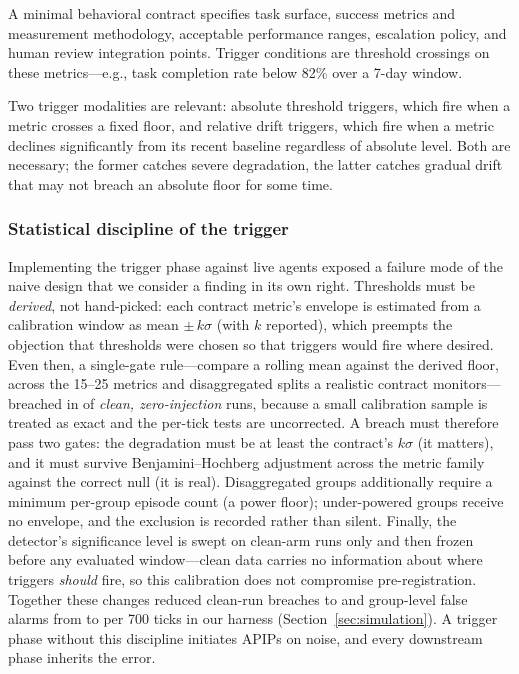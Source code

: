 A minimal behavioral contract specifies task surface, success metrics and
measurement methodology, acceptable performance ranges, escalation policy, and
human review integration points. Trigger conditions are threshold crossings on
these metrics---e.g., task completion rate below 82\% over a 7-day window.

Two trigger modalities are relevant: absolute threshold triggers, which fire
when a metric crosses a fixed floor, and relative drift triggers, which fire
when a metric declines significantly from its recent baseline regardless of
absolute level. Both are necessary; the former catches severe degradation, the
latter catches gradual drift that may not breach an absolute floor for some
time.

\subsubsection{Statistical discipline of the trigger}
\label{subsubsec:trigger-stats}

Implementing the trigger phase against live agents exposed a failure mode of
the naive design that we consider a finding in its own right. Thresholds must
be \emph{derived}, not hand-picked: each contract metric's envelope is
estimated from a calibration window as mean $\pm\, k\sigma$ (with $k$
reported), which preempts the objection that thresholds were chosen so that
triggers would fire where desired. Even then, a single-gate rule---compare a
rolling mean against the derived floor, across the 15--25 metrics and
disaggregated splits a realistic contract monitors---breached in
\cleanFalseBreachBefore{} of \emph{clean, zero-injection} runs, because a
small calibration sample is treated as exact and the per-tick tests are
uncorrected. A breach must therefore pass two gates: the degradation must be
at least the contract's $k\sigma$ (it matters), and it must survive
Benjamini--Hochberg adjustment across the metric family against the correct
null (it is real). Disaggregated groups additionally require a minimum
per-group episode count (a power floor); under-powered groups receive no
envelope, and the exclusion is recorded rather than silent. Finally, the
detector's significance level is swept on clean-arm runs only and then
frozen before any evaluated window---clean data carries no information about
where triggers \emph{should} fire, so this calibration does not compromise
pre-registration. Together these changes reduced clean-run breaches to
\cleanFalseBreachAfter{} and group-level false alarms from
\groupFalseAlarmsBefore{} to \groupFalseAlarmsAfter{} per 700 ticks in our
harness (Section~\ref{sec:simulation}). A trigger phase without this
discipline initiates APIPs on noise, and every downstream phase inherits the
error.

